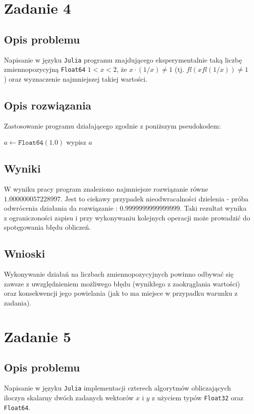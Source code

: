\documentclass{classrep}
\begin{document}
\section{Zadanie 4}
	\subsection{Opis problemu}
		Napisanie w języku \texttt{Julia} programu znajdującego eksperymentalnie taką liczbę zmiennopozycyjną 
		\texttt{Float64} $1<x<2$, że $x\cdot(1/x)\neq1$ (tj. $fl(xfl(1/x))\neq1$) oraz wyznaczenie najmniejszej takiej
		wartości.
	\subsection{Opis rozwiązania}
		Zastosowanie programu działającego zgodnie z poniższym pseudokodem:
		\begin{algorithm}
		\begin{algorithmic}
			\State $a\gets \texttt{Float64}(1.0)$
					wypisz $a$
				\EndIf
			\EndWhile
		\end{algorithmic}
		\caption{}
		\end{algorithm}
		
	\subsection{Wyniki}
		W wyniku pracy program znaleziono najmniejsze rozwiązanie równe \\ $1.000000057228997$.
		Jest to ciekawy przypadek nieodwracalności dzielenia - próba odwrócenia działania da rozwiązanie : $0.9999999999999999$.
		Taki rezultat wynika z ograniczoności zapisu i przy wykonywaniu kolejnych operacji może prowadzić do spotęgowania błędu obliczeń.
	\subsection{Wnioski}
		Wykonywanie działań na liczbach zmiennopozycyjnych powinno odbywać się zawsze z uwzględnieniem możliwego błędu (wynikłego z zaokrąglania wartości) 
		oraz konsekwencji jego powielania (jak to ma miejsce w przypadku warunku z zadania).
\section{Zadanie 5}
	\subsection{Opis problemu}
		Napisanie w języku \texttt{Julia} implementacji czterech algorytmów obliczających iloczyn skalarny dwóch 
		zadanych wektorów $x$ i $y$ z użyciem typów \texttt{Float32} oraz \texttt{Float64}.
\end{document}

